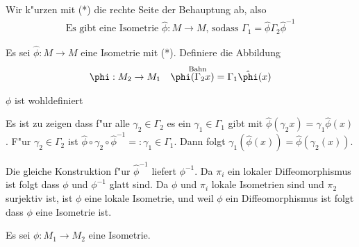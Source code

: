 \begin{Loes}
Wir k"urzen mit (*) die rechte Seite der Behauptung ab, also
\begin{align*}
	\text{Es gibt eine Isometrie } \hat\phi: M \to M \text{, sodass } \Gamma_1 = \hat\phi \Gamma_2 \hat\phi^{-1} \tag{*}
\end{align*}
\begin{description}[leftmargin=*]
\item[\quot{$\bm{\Leftarrow}$}:]
	Es sei $\hat\phi: M \to M$ eine Isometrie mit (*).
	Definiere die Abbildung
	\begin{align*}
		\phi: M_2 \to M_1 && \phi(\overset{\mathclap{\text{Bahn}}}\Gamma_2 x) = \Gamma_1 \hat\phi(x)
	\end{align*}
	\begin{description}[leftmargin=*,font=\normalfont\itshape]
	\item[Behauptung:]
		$\phi$ ist wohldefiniert
	\item[Beweis:]
		Es ist zu zeigen dass f"ur alle $\gamma_2 \in \Gamma_2$ es ein $\gamma_1 \in \Gamma_1$ gibt mit $\hat\phi(\gamma_2 x) = \gamma_1 \hat\phi(x)$.
		F"ur $\gamma_2 \in \Gamma_2$ ist $\hat\phi \circ \gamma_2 \circ \hat\phi^{-1} =: \gamma_1 \in \Gamma_1$. Dann folgt $\gamma_1(\hat\phi(x)) = \hat\phi(\gamma_2(x))$.
	\end{description}
	Die gleiche Konstruktion f"ur $\hat\phi^{-1}$ liefert $\phi^{-1}$.
	Da $\pi_i$ ein lokaler Diffeomorphismus ist folgt dass $\phi$ und $\phi^{-1}$ glatt sind.
	Da $\phi$ und $\pi_i$ lokale Isometrien sind und $\pi_2$ surjektiv ist, ist $\phi$ eine lokale Isometrie, und weil $\phi$ ein Diffeomorphismus ist folgt dass $\phi$ eine Isometrie ist.
\item[\quot{$\bm{\Rightarrow}$}:]
	Es sei $\phi: M_1 \to M_2$ eine Isometrie.
\end{description}
\end{Loes}
